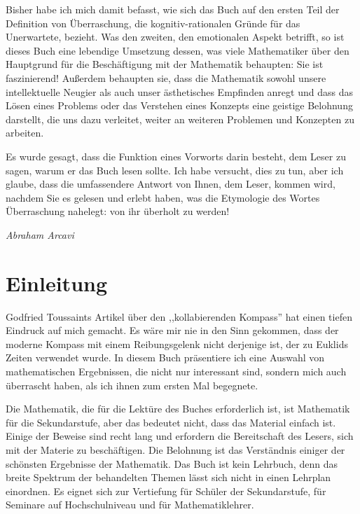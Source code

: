 Bisher habe ich mich damit befasst, wie sich das Buch auf den ersten Teil der Definition von Überraschung, die kognitiv-rationalen Gründe für das Unerwartete, bezieht. Was den zweiten, den emotionalen Aspekt betrifft, so ist dieses Buch eine lebendige Umsetzung dessen, was viele Mathematiker über den Hauptgrund für die Beschäftigung mit der Mathematik behaupten: Sie ist faszinierend! Außerdem behaupten sie, dass die Mathematik sowohl unsere intellektuelle Neugier als auch unser ästhetisches Empfinden anregt und dass das Lösen eines Problems oder das Verstehen eines Konzepts eine geistige Belohnung darstellt, die uns dazu verleitet, weiter an weiteren Problemen und Konzepten zu arbeiten. 

Es wurde gesagt, dass die Funktion eines Vorworts darin besteht, dem Leser zu sagen, warum er das Buch lesen sollte. Ich habe versucht, dies zu tun, aber ich glaube, dass die umfassendere Antwort von Ihnen, dem Leser, kommen wird, nachdem Sie es gelesen und erlebt haben, was die Etymologie des Wortes Überraschung nahelegt: von ihr überholt zu werden!

\begin{flushright}
\textit{Abraham Arcavi}
\end{flushright}

\chapter*{Einleitung}

Godfried Toussaints Artikel über den ,,kollabierenden Kompass'' hat einen tiefen Eindruck auf mich gemacht. Es wäre mir nie in den Sinn gekommen, dass der moderne Kompass mit einem Reibungsgelenk nicht derjenige ist, der zu Euklids Zeiten verwendet wurde. In diesem Buch präsentiere ich eine Auswahl von mathematischen Ergebnissen, die nicht nur interessant sind, sondern mich auch überrascht haben, als ich ihnen zum ersten Mal begegnete.

Die Mathematik, die für die Lektüre des Buches erforderlich ist, ist Mathematik für die Sekundarstufe, aber das bedeutet nicht, dass das Material einfach ist. Einige der Beweise sind recht lang und erfordern die Bereitschaft des Lesers, sich mit der Materie zu beschäftigen. Die Belohnung ist das Verständnis einiger der schönsten Ergebnisse der Mathematik. Das Buch ist kein Lehrbuch, denn das breite Spektrum der behandelten Themen lässt sich nicht in einen Lehrplan einordnen. Es eignet sich zur Vertiefung für Schüler der Sekundarstufe, für Seminare auf Hochschulniveau und für Mathematiklehrer.

